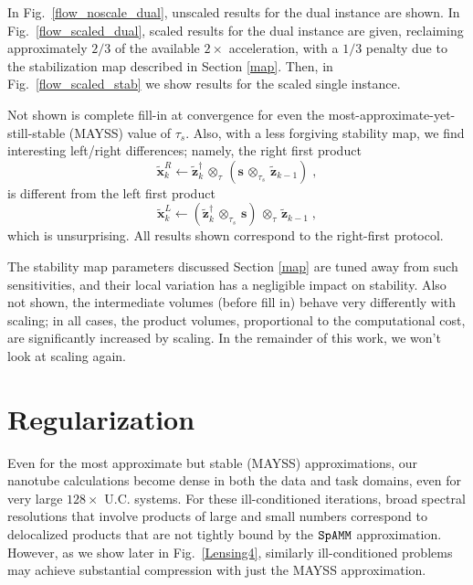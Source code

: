 \documentclass[letterpaper,twocolumn,amsmath,amsfont,amssymb,english,aps,jcp,preprintnumbers,groupaddress,nofootinbib,tightenlines,floatfix]{revtex4}
\newcommand{\mat}[1]{\boldsymbol{#1}}
\newcommand{\ot}{  {\scriptstyle \otimes}_{ \tau } }
\newcommand{\ots}{ {\scriptstyle \otimes}_{ \! \tau_s } }
\theoremstyle{plain}
\theoremstyle{remark}
\theoremstyle{plain}
\begin{document}
In Fig.~\ref{flow_noscale_dual}, unscaled results for the dual instance are shown.  In Fig.~\ref{flow_scaled_dual}, scaled results for the
dual instance are given, reclaiming approximately $2/3$ of the available $2 \times$ acceleration, with a $1/3$ penalty due to the
stabilization map described in Section \ref{map}. Then, in Fig.~\ref{flow_scaled_stab} we show results for the scaled single instance. 

Not shown is complete fill-in at convergence for even the most-approximate-yet-still-stable (MAYSS) value of $\tau_s$.  
Also, with a less forgiving stability map, we find interesting 
left/right differences;  namely, the right first product 
\begin{equation} 
\widetilde{\mat{x}}^R_k \leftarrow \widetilde{\mat{z}}^\dagger_{k} \, \ot  \, \left( \mat{s} \,  \ots \, \widetilde{\mat{z}}_{k-1}  \right) \; ,
\end{equation}
is  different from the left first product 
\begin{equation} 
\widetilde{\mat{x}}^L_k \leftarrow \left(  \widetilde{\mat{z}}^\dagger_{k} \, \ots \, \mat{s} \right) \,  \ot  \, \widetilde{\mat{z}}_{k-1} \; ,
\end{equation}
which is unsurprising.  All results shown correspond to the right-first protocol.

The stability map parameters discussed Section \ref{map} 
are tuned away from such sensitivities, and their local variation has a negligible impact on stability.  
Also not shown, the intermediate volumes (before fill in) behave very differently with scaling; in all cases, the product volumes,
proportional to the computational cost, are significantly increased by scaling.  In the remainder of this work, we won't look at scaling again.

\section{Regularization}\label{regularization}

Even for the most approximate but stable (MAYSS) approximations, our nanotube calculations become dense in both the data and task domains, 
even for very large $128 \times$ U.C. systems.  For these ill-conditioned iterations, broad spectral resolutions that involve products of 
large and small numbers correspond to delocalized products that are not tightly bound by the $\tt SpAMM$ approximation.   However, as 
we show later in Fig.~\ref{Lensing4}, similarly ill-conditioned problems may achieve substantial compression with just the MAYSS 
approximation. 
\end{document}
